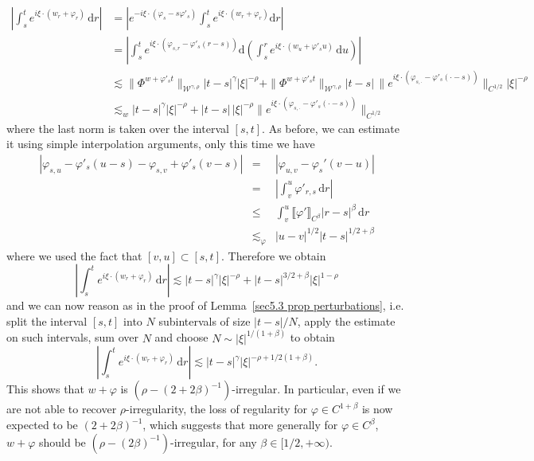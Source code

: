 \documentclass[10pt]{article}
\newcommand{\mathd}{\mathrm{d}}
\begin{document}
\begin{align*}
  \left| \int_s^t e^{i \xi \cdot (w_r + \varphi_r)} \, \mathd r \right| & =
  \left| e^{- i \xi \cdot (\varphi_s - s \varphi'_s)} \int^t_s e^{i \xi \cdot
  (w_r + \varphi_r)} \mathd r \right|\\
  & = \left| \int_s^t e^{i \xi \cdot (\varphi_{s, r} - \varphi'_s (r - s))}
  \mathd \left( \int_s^r e^{i \xi \cdot (w_u + \varphi'_s u)} \, \mathd u
  \right) \right|\\
  & \lesssim \| \Phi^{w + \varphi'_s t} \|_{\mathcal{W}^{\gamma, \rho}} | t -
  s |^{\gamma} | \xi |^{- \rho} + \| \Phi^{w + \varphi'_s t}
  \|_{\mathcal{W}^{\gamma, \rho}} | t - s | \, \| e^{i \xi \cdot (\varphi_{s,
  \cdot} - \varphi'_s (\cdot - s))} \|_{C^{1 / 2}} | \xi |^{- \rho}\\
  & \lesssim_w | t - s |^{\gamma} | \xi |^{- \rho} + | t - s | \, | \xi |^{-
  \rho} \| e^{i \xi \cdot (\varphi_{s, \cdot} - \varphi'_s (\cdot - s))}
  \|_{C^{1 / 2}}
\end{align*}
%
where the last norm is taken over the interval $[s, t]$. As before, we can
estimate it using simple interpolation arguments, only this time we have
\[ \begin{array}{lll}
     | \varphi_{s, u} - \varphi'_s (u - s) - \varphi_{s, v} + \varphi'_s (v -
     s) | & = & | \varphi_{u, v} - \varphi_s' (v - u) |\\
     & = & \left| \int_v^u \varphi'_{r, s} \, \mathd r \right|\\
     & \leqslant & \int_v^u \llbracket \varphi' \rrbracket_{C^{\beta}} | r -
     s |^{\beta} \, \mathd r\\
     & \lesssim_{\varphi} & | u - v |^{1 / 2} | t - s |^{1 / 2 + \beta}
   \end{array} \]
where we used the fact that $[v, u] \subset [s, t]$. Therefore we obtain
\[ \left| \int_s^t e^{i \xi \cdot (w_r + \varphi_r)} \, \mathd r \right|
   \lesssim | t - s |^{\gamma} | \xi |^{- \rho} + | t - s |^{3 / 2 + \beta} |
   \xi |^{1 - \rho} \]
and we can now reason as in the proof of Lemma~\ref{sec5.3 prop
perturbations}, i.e. split the interval $[s, t]$ into $N$ subintervals of size
$| t - s | / N$, apply the estimate on such intervals, sum over $N$ and choose
$N \sim | \xi |^{1 / (1 + \beta)}$ to obtain
\[ \left| \int_s^t e^{i \xi \cdot (w_r + \varphi_r)} \, \mathd r \right|
   \lesssim | t - s |^{\gamma} | \xi |^{- \rho + 1 / 2 (1 + \beta)} . \]
This shows that $w + \varphi$ is $(\rho - (2 + 2 \beta)^{-
1})$\mbox{-}irregular. In particular, even if we are not able to recover
$\rho$\mbox{-}irregularity, the loss of regularity for $\varphi \in C^{1 +
\beta}$ is now expected to be $(2 + 2 \beta)^{- 1}$, which suggests that more
generally for $\varphi \in C^{\beta}$, $w + \varphi$ should be $(\rho - (2
\beta)^{- 1})$\mbox{-}irregular, for any $\beta \in [1 / 2, + \infty)$.
\end{document}
